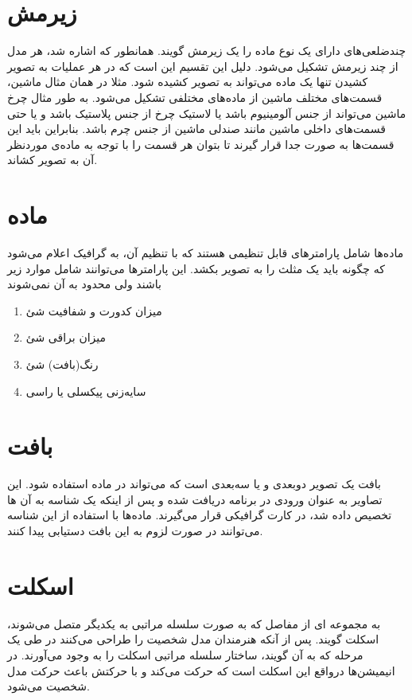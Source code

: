 \section{زیرمش
\protect{}
}
چندضلعی‌های دارای یک نوع ماده
را یک زیرمش گویند.
همانطور که اشاره شد، هر مدل از چند زیرمش تشکیل می‌شود. دلیل این تقسیم این است که در هر عملیات به تصویر کشیدن
تنها یک ماده می‌تواند به تصویر کشیده شود. مثلا در همان مثال ماشین، قسمت‌های مختلف ماشین از ماده‌های مختلفی تشکیل می‌شود. به طور مثال چرخ ماشین می‌تواند از جنس آلومینیوم باشد یا لاستیک چرخ از جنس پلاستیک باشد و یا حتی قسمت‌های داخلی ماشین مانند صندلی ماشین از جنس چرم باشد.
بنابراین باید این قسمت‌ها به صورت جدا قرار گیرند تا بتوان هر قسمت را با توجه به ماده‌ی موردنظر آن به تصویر کشاند.

\section{ماده 
\protect{}
}
ماده‌ها شامل پارامتر‌های قابل تنظیمی هستند که با تنظیم آن، به گرافیک اعلام می‌شود که چگونه باید یک مثلث را به تصویر بکشد.
این پارامترها می‌توانند شامل موارد زیر باشند ولی محدود به آن نمی‌شوند

\begin{enumerate}
	\item میزان کدورت و شفافیت شئ
 	\item میزان براقی شئ
 	\item رنگ(بافت) شئ
 	\item سایه‌زنی پیکسلی یا راسی \protect{}
\end{enumerate}


\section{بافت
\protect{}
}
بافت یک تصویر دوبعدی و یا سه‌بعدی است که می‌تواند در ماده استفاده شود.
این تصاویر به عنوان ورودی در برنامه دریافت شده و پس از اینکه یک شناسه به آن ها تخصیص داده شد، در کارت گرافیکی قرار می‌گیرند. ماده‌ها با استفاده از این شناسه می‌توانند در صورت لزوم به این بافت دستیابی پیدا کنند.


\section{اسکلت}

به مجمو‌عه ای از مفاصل که به صورت سلسله مراتبی به یکدیگر متصل می‌شوند، اسکلت گویند. پس از آنکه هنرمندان مدل شخصیت را طراحی می‌کنند در طی یک مرحله که به آن
گویند، ساختار سلسله مراتبی اسکلت را به وجود می‌آورند.
در انیمیشن‌ها درواقع این اسکلت‌ است که حرکت می‌کند و با حرکتش باعث حرکت مدل شخصیت می‌شود.


